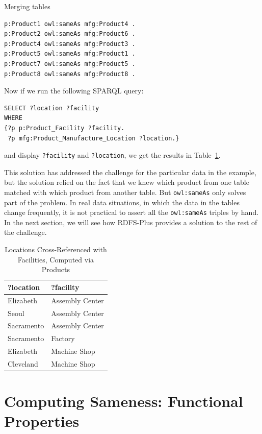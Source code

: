 \begin{challenge}{Merging tables}
\begin{lstlisting}
p:Product1 owl:sameAs mfg:Product4 .
p:Product2 owl:sameAs mfg:Product6 .
p:Product4 owl:sameAs mfg:Product3 .
p:Product5 owl:sameAs mfg:Product1 .
p:Product7 owl:sameAs mfg:Product5 .
p:Product8 owl:sameAs mfg:Product8 .
\end{lstlisting}

Now if we run the following SPARQL query:

\begin{lstlisting}
SELECT ?location ?facility 
WHERE
{?p p:Product_Facility ?facility.
 ?p mfg:Product_Manufacture_Location ?location.}
\end{lstlisting}

and display \texttt{?facility} and \texttt{?location}, we get the results in Table~\ref{tab:ch9.3}.
\end{challenge}

This solution has addressed the challenge for the particular data in the
example, but the solution relied on the fact that we knew which product
from one table matched with which product from another table. But
\texttt{owl:sameAs} only solves part of the problem. In real data situations, in
which the data in the tables change  frequently, it is not practical to assert all the \texttt{owl:sameAs} triples by
hand. In the next section, we will see how
RDFS-Plus provides a solution to the rest of the challenge.

\begin{table}
\caption{Locations Cross-Referenced with Facilities, Computed via
Products\label{tab:ch9.3}}
\begin{tabular}{|ll|}
\hline
?location&?facility\\
\hline
Elizabeth&Assembly Center\\
Seoul&Assembly Center\\
Sacramento&Assembly Center\\
Sacramento&Factory\\
Elizabeth&Machine Shop\\
Cleveland&Machine Shop \\
\hline
\end{tabular}
\end{table}



\section{Computing Sameness: Functional Properties}

